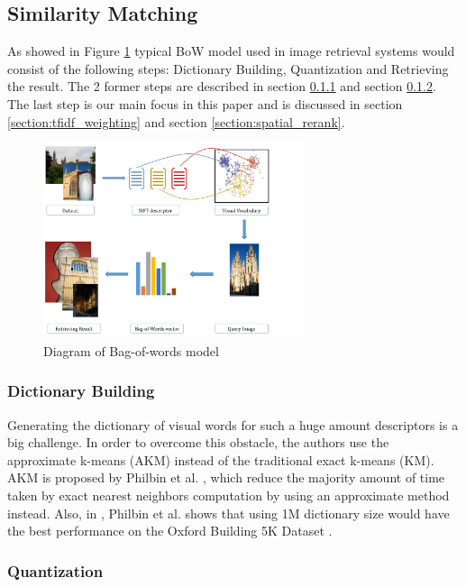 \subsection{Similarity Matching} \label{section:similarity_extraction}

As showed in Figure \ref{fig:bow_model} typical BoW model used in image retrieval systems would consist of the following steps: Dictionary Building, Quantization and Retrieving the result. The 2 former steps are described in section \ref{section:dictionary_building} and section \ref{section:quantization}. The last step is our main focus in this paper and is discussed in section \ref{section:tfidf_weighting} and section \ref{section:spatial_rerank}.

\begin{figure}
    \centering
    \includegraphics[width=3.0in]{process.pdf}
    \caption{Diagram of Bag-of-words model}
    \label{fig:bow_model}
\end{figure}

\subsubsection{Dictionary Building} \label{section:dictionary_building}

Generating the dictionary of visual words for such a huge amount descriptors is a big challenge. In order to overcome this obstacle, the authors use the approximate k-means (AKM) instead of the traditional exact k-means (KM). AKM is proposed by Philbin et al. \cite{2}, which reduce the majority amount of time taken by exact nearest neighbors computation by using an approximate method instead. Also, in \cite{2}, Philbin et al. shows that using 1M dictionary size would have the best performance on the Oxford Building 5K Dataset \cite{oxbuilding}.

\subsubsection{Quantization} \label{section:quantization}


